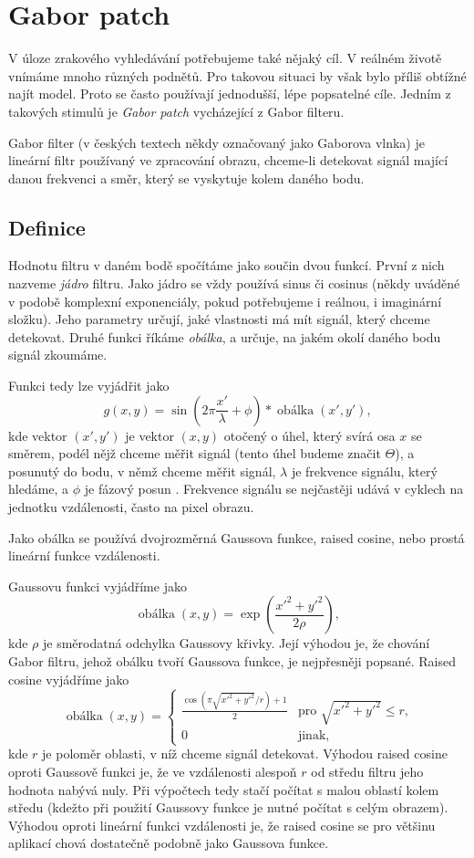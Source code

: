 \section{Gabor patch}


V úloze zrakového vyhledávání potřebujeme také nějaký cíl. V reálném životě
vnímáme mnoho různých podnětů. Pro takovou situaci by však bylo příliš obtížné
najít model. Proto se často používají jednodušší, lépe popsatelné cíle.  Jedním z takových
stimulů je {\it Gabor patch} vycházející z Gabor filteru.

Gabor filter (v českých textech někdy označovaný jako Gaborova vlnka) je
lineární filtr používaný ve zpracování obrazu, chceme-li detekovat signál
mající danou frekvenci a směr, který se vyskytuje kolem daného bodu.

\subsection{Definice}

Hodnotu filtru v daném bodě spočítáme jako součin dvou funkcí. První z nich
nazveme {\it jádro} filtru. Jako jádro se vždy používá sinus či cosinus (někdy
uváděné v podobě komplexní exponenciály, pokud potřebujeme i reálnou, i
imaginární složku). Jeho parametry určují, jaké vlastnosti má mít signál, který
chceme detekovat. Druhé funkci říkáme {\it obálka}, a určuje, na jakém okolí daného
bodu signál zkoumáme.

Funkci tedy lze vyjádřit jako $$g(x,y) =
\sin\left(2\pi\frac{x'}{\lambda}+\phi\right)*\operatorname{obálka}(x',y'),$$
kde vektor $(x',y')$ je vektor $(x,y)$ otočený o úhel, který svírá osa $x$
se směrem, podél nějž chceme měřit signál (tento úhel budeme značit $\Theta$),
a posunutý do bodu, v němž chceme měřit signál, $\lambda$ je frekvence signálu,
který hledáme, a $\phi$ je fázový posun \citep{GaborPatch}. Frekvence signálu
se nejčastěji udává v cyklech na jednotku vzdálenosti, často na pixel obrazu.

Jako obálka se používá dvojrozměrná Gaussova funkce, raised cosine, nebo prostá
lineární funkce vzdálenosti. 

Gaussovu funkci vyjádříme jako $$ \operatorname{obálka}(x,y) =
\exp\left(\frac{x'^2 + y'^2}{2\rho}\right),$$ kde $\rho$ je směrodatná odchylka
Gaussovy křivky. Její výhodou je, že chování Gabor filtru, jehož obálku tvoří
Gaussova funkce, je nejpřesněji popsané. Raised cosine vyjádříme jako 
$$
\operatorname{obálka}(x,y)=
\begin{cases}
 \frac{\cos(\pi\sqrt{x'^2+y'^2}/r)+1}2 &\text{pro $\sqrt{x'^2+y'^2}\leq r$,}\\[1ex]
 0 &\text{jinak,}
\end{cases}
$$ kde $r$ je poloměr oblasti, v níž chceme signál detekovat. Výhodou raised
cosine oproti Gaussově funkci je, že ve vzdálenosti alespoň $r$ od středu
filtru jeho hodnota nabývá nuly. Při výpočtech tedy stačí počítat s malou
oblastí kolem středu (kdežto při použití Gaussovy funkce je nutné počítat s
celým obrazem). Výhodou oproti lineární funkci vzdálenosti je, že raised cosine
se pro většinu aplikací chová dostatečně podobně jako Gaussova funkce.

